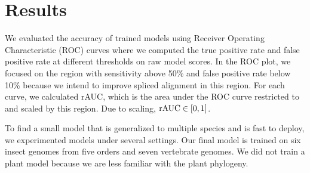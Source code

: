 \documentclass[webpdf,contemporary,large,namedate]{oup-authoring-template}%
\begin{document}
\section{Results}

We evaluated the accuracy of trained models using Receiver Operating Characteristic (ROC) curves
where we computed the true positive rate and false positive rate at different thresholds on raw model scores.
In the ROC plot, we focused on the region with sensitivity above 50\% and false positive rate below 10\%
because we intend to improve spliced alignment in this region.
For each curve, we calculated rAUC, which is the area under the ROC curve restricted to and scaled by this region.
Due to scaling, ${\rm rAUC}\in[0,1]$.

To find a small model that is generalized to multiple species and is fast to deploy,
we experimented models under several settings.
Our final model is trained on six insect genomes from five orders and seven vertebrate genomes.
We did not train a plant model because we are less familiar with the plant phylogeny.
\end{document}
